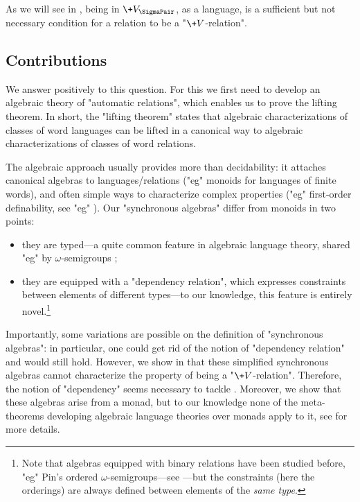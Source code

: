 As we will see in , being in $\+V_{\SigmaPair}$, as a language,
is a sufficient but not necessary condition for a relation to be a "$\+V$-relation".

\subsection{Contributions}

We answer positively to this question.
For this we first need to develop an algebraic theory of "automatic relations",
which enables us to prove the lifting theorem. In short, the "lifting theorem" states that algebraic characterizations of classes of word languages can be lifted in a canonical way to algebraic characterizations of classes of word relations.

The algebraic approach usually provides more than decidability: it attaches
canonical algebras to languages/relations ("eg" monoids for languages of finite words), and often simple ways to characterize complex properties ("eg" first-order definability, see "eg" \cite[Theorem 2.6, p.~40]{Bojanczyk2020MSO}).
Our "synchronous algebras" differ from monoids in two points:
\begin{itemize}
	\item they are typed---a quite common feature in algebraic language theory, shared "eg" by $\omega$-semigroups \cite[\S 4.1, p.~91]{Perrin2004InfiniteWords};
	\item they are equipped with a "dependency relation", which expresses constraints between 
	elements of different types---to our knowledge, this feature is entirely novel.\footnote{Note that algebras equipped with binary relations have been studied before, "eg" Pin's ordered 
	$\omega$-semigroups---see \cite[\S 2.4, p.~7]{Pin1998PositiveVarieties}---but the constraints (here the 
	orderings) are always defined between elements of the \emph{same type}.}
\end{itemize}

Importantly, some variations are possible on the definition of "synchronous algebras":
in particular, one could get rid of the notion of "dependency relation" and 
 would still hold.
However, we show in  that these
simplified synchronous algebras cannot characterize the property of being a "$\+V$-relation".
Therefore, the notion of "dependency" seems necessary to tackle .
Moreover, we show that these algebras arise from a monad, but to our knowledge none of the 
meta-theorems developing algebraic language theories over monads apply to it,
see  for more details.

